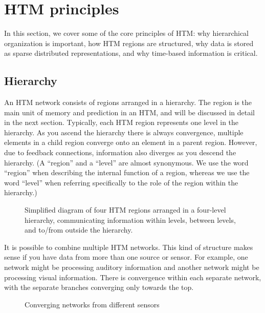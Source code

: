 \documentclass{report}
\begin{document}
\section*{HTM principles}

In this section, we cover some of the core principles of HTM: why
hierarchical organization is important, how HTM regions are
structured, why data is stored as sparse distributed representations,
and why time-based information is critical.

\subsection*{Hierarchy}

An HTM network consists of regions arranged in a hierarchy. The region
is the main unit of memory and prediction in an HTM, and will be
discussed in detail in the next section. Typically, each HTM region
represents one level in the hierarchy. As you ascend the hierarchy
there is always convergence, multiple elements in a child region
converge onto an element in a parent region. However, due to feedback
connections, information also diverges as you descend the
hierarchy. (A ``region'' and a ``level'' are almost synonymous. We use
the word ``region'' when describing the internal function of a region,
whereas we use the word ``level'' when referring specifically to the
role of the region within the hierarchy.)

\begin{figure}
\caption{Simplified diagram of four HTM regions arranged in a
  four-level hierarchy, communicating information within levels,
  between levels, and to/from outside the hierarchy.}
\label{figure:region-hierarchy}
\end{figure}

It is possible to combine multiple HTM networks. This kind of
structure makes sense if you have data from more than one source or
sensor. For example, one network might be processing auditory
information and another network might be processing visual
information. There is convergence within each separate network, with
the separate branches converging only towards the top.

\begin{figure}
\caption{Converging networks from different sensors}
\label{figure:multimodal-convergence}
\end{figure}
\end{document}
